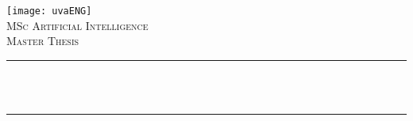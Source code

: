 







% 





\begin{titlepage}



\newcommand{\HRule}{\rule{\linewidth}{0.5mm}} %

\center %

 






\texttt{[image: uvaENG]}\\[2.5cm]

\textsc{\Large MSc Artificial Intelligence}\\[0.2cm]

\textsc{\Large Master Thesis}\\[0.5cm] 








\HRule \\[0.4cm]

{ \huge \bfseries {}}\\[0.4cm] %

\HRule \\[0.5cm]

 



\end{titlepage}
